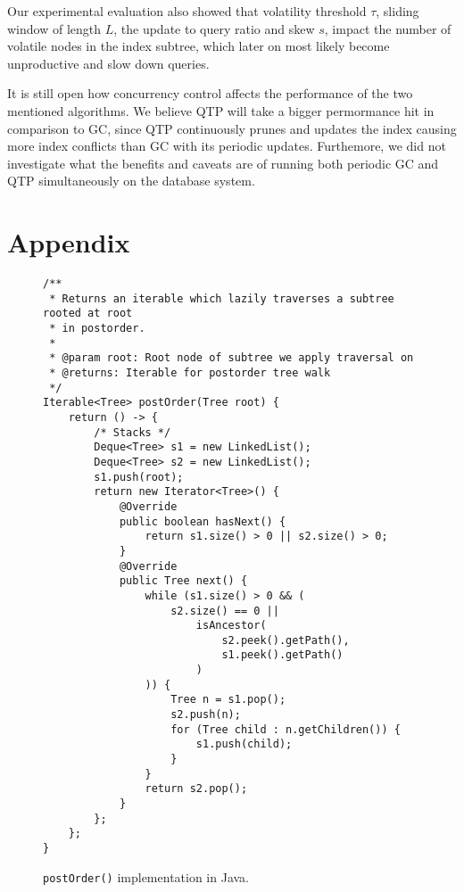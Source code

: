 \documentclass[abstracton,12pt]{scrartcl}
\theoremstyle{definition}
\begin{document}
Our experimental evaluation also showed that volatility threshold $\tau$, sliding
window of length $L$, the update to query ratio and skew $s$, impact the number
of volatile nodes in the index subtree, which later on most likely become
unproductive and slow down queries.

It is still open how concurrency control affects the performance of the two mentioned
algorithms. We believe QTP will take a bigger permormance hit in comparison to GC, since
QTP continuously prunes and updates the index causing more index conflicts than
GC with its periodic updates. Furthemore, we did not investigate what the benefits and caveats
are of running both periodic GC and QTP simultaneously on the database system.

\newpage




\newpage

\section{Appendix}

\begin{figure}[H]
  \centering
  \small
  \begin{framed}
\begin{verbatim}
/**
 * Returns an iterable which lazily traverses a subtree rooted at root
 * in postorder.
 *
 * @param root: Root node of subtree we apply traversal on
 * @returns: Iterable for postorder tree walk
 */
Iterable<Tree> postOrder(Tree root) {
    return () -> {
        /* Stacks */
        Deque<Tree> s1 = new LinkedList();
        Deque<Tree> s2 = new LinkedList();
        s1.push(root);
        return new Iterator<Tree>() {
            @Override
            public boolean hasNext() {
                return s1.size() > 0 || s2.size() > 0;
            }
            @Override
            public Tree next() {
                while (s1.size() > 0 && (
                    s2.size() == 0 ||
                        isAncestor(
                            s2.peek().getPath(),
                            s1.peek().getPath()
                        )
                )) {
                    Tree n = s1.pop();
                    s2.push(n);
                    for (Tree child : n.getChildren()) {
                        s1.push(child);
                    }
                }
                return s2.pop();
            }          
        };
    };
}
\end{verbatim}
  \end{framed}
  \caption{\texttt{postOrder()} implementation in Java.}
  \label{fig:java_postorder}
\end{figure}
\end{document}

